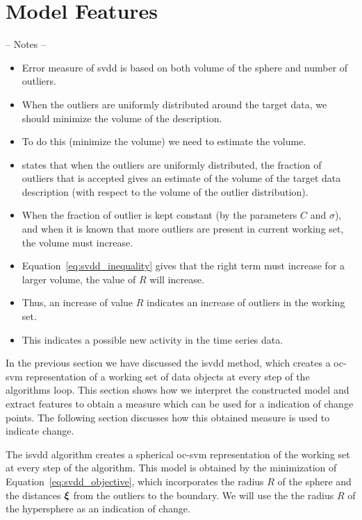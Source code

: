 \section{Model Features}\label{sec:method_model_features}

-- Notes --
\begin{itemize}
  \item Error measure of \gls{svdd} is based on both volume of the sphere and number of outliers.
  \item When the outliers are uniformly distributed around the target data, we should minimize the volume of the description.
  \item To do this (minimize the volume) we need to estimate the volume.
  \item \cite{tax2002uniform} states that when the outliers are uniformly distributed, the fraction of outliers that is accepted gives an estimate of the volume of the target data description (with respect to the volume of the outlier distribution).
  \item When the fraction of outlier is kept constant (by the parameters $C$ and $\sigma$), and when it is known that more outliers are present in current working set, the volume must increase.
  \item Equation~\ref{eq:svdd_inequality} gives that the right term must increase for a larger volume, \ie the value of $R$ will increase.
  \item Thus, an increase of value $R$ indicates an increase of outliers in the working set.
  \item This indicates a possible new activity in the time series data.
\end{itemize}

In the previous section we have discussed the \gls{isvdd} method, which creates a \gls{oc-svm} representation of a working set of data objects at every step of the algorithms loop.
This section shows how we interpret the constructed model and extract features to obtain a measure which can be used for a indication of change points.
The following section discusses how this obtained measure is used to indicate change.

The \gls{isvdd} algorithm creates a spherical \gls{oc-svm} representation of the working set at every step of the algorithm.
This model is obtained by the minimization of Equation~\ref{eq:svdd_objective}, which incorporates the radius $R$ of the sphere and the distances $\vectorsym{\xi}$ from the outliers to the boundary.
We will use the the radius $R$ of the hypersphere as an indication of change.

